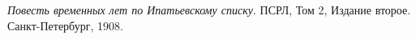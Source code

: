 \emph{Повесть временных лет по Ипатьевскому списку}. ПСРЛ, Том 2, Издание второе. Санкт-Петербург, 1908. 


